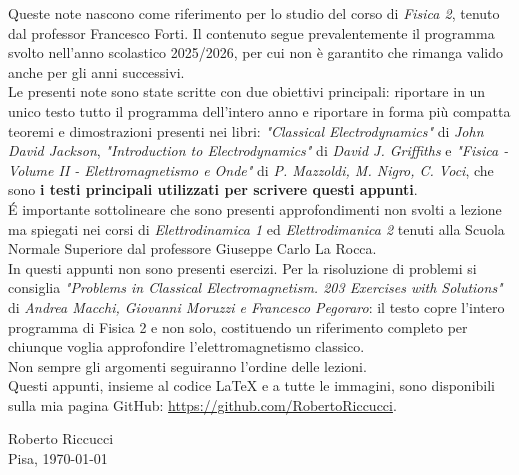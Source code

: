 Queste note nascono come riferimento per lo studio del corso di \emph{Fisica 2}, tenuto dal professor Francesco Forti. Il contenuto segue prevalentemente il programma svolto nell'anno scolastico 2025/2026, per cui non è garantito che rimanga valido anche per gli anni successivi. \\
Le presenti note sono state scritte con due obiettivi principali: riportare in un unico testo tutto il programma dell'intero anno e riportare in forma più compatta teoremi e dimostrazioni presenti nei libri: \emph{"Classical Electrodynamics"} di \emph{John David Jackson}, \emph{"Introduction to Electrodynamics"} di \emph{David J. Griffiths} e \emph{"Fisica - Volume II - Elettromagnetismo e Onde"} di \emph{P. Mazzoldi, M. Nigro, C. Voci}, che sono \textbf{i testi principali utilizzati per scrivere questi appunti}.\\

\' E importante sottolineare che sono presenti approfondimenti non svolti a lezione ma spiegati nei corsi di \emph{Elettrodinamica 1} ed \emph{Elettrodimanica 2} tenuti alla Scuola Normale Superiore dal professore Giuseppe Carlo La Rocca. \\

In questi appunti non sono presenti esercizi. Per la risoluzione di problemi si consiglia \emph{"Problems in Classical Electromagnetism. 203 Exercises with Solutions"} di \emph{Andrea Macchi, Giovanni Moruzzi e Francesco Pegoraro}: il testo copre l'intero programma di Fisica 2 e non solo, costituendo un riferimento completo per chiunque voglia approfondire l'elettromagnetismo classico.\\

Non sempre gli argomenti seguiranno l'ordine delle lezioni. \\

Questi appunti, insieme al codice \LaTeX{} e a tutte le immagini, sono disponibili sulla mia pagina GitHub: \url{https://github.com/RobertoRiccucci}.

\begin{flushright}
Roberto Riccucci\\
Pisa, \today
\end{flushright}

\tableofcontents
